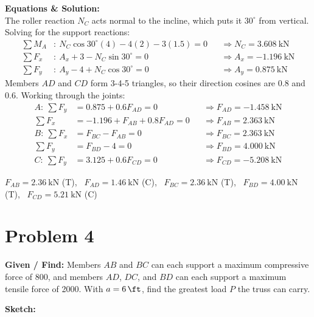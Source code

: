 \documentclass[11pt]{article}
\newcommand{\problemstart}[2]{%
    \clearpage
    \setlength{\parskip}{0.5\baselineskip}
    \setlength{\abovedisplayskip}{4pt}\setlength{\belowdisplayskip}{4pt}
    \section*{Problem #1}
    \textbf{Given / Find:} #2

    \textbf{Sketch:}
}
\begin{document}
\textbf{Equations \& Solution:}\\
The roller reaction $N_C$ acts normal to the incline, which puts it $30^\circ$ from vertical. Solving for the support reactions:
\begin{align*}
\textstyle\sum M_A&:\ N_C\cos30^\circ(4)-4(2)-3(1.5)=0 &&\Rightarrow N_C=\SI{3.608}{\kN}\\
\textstyle\sum F_x&:\ A_x+3-N_C\sin30^\circ=0 &&\Rightarrow A_x=\SI{-1.196}{\kN}\\
\textstyle\sum F_y&:\ A_y-4+N_C\cos30^\circ=0 &&\Rightarrow A_y=\SI{0.875}{\kN}
\end{align*}
Members $AD$ and $CD$ form 3-4-5 triangles, so their direction cosines are 0.8 and 0.6. Working through the joints:
\begin{align*}
A:\ \textstyle\sum F_y&=0.875+0.6F_{AD}=0 &&\Rightarrow F_{AD}=\SI{-1.458}{\kN}\\
\textstyle\sum F_x&=-1.196+F_{AB}+0.8F_{AD}=0 &&\Rightarrow F_{AB}=\SI{2.363}{\kN}\\
B:\ \textstyle\sum F_x&=F_{BC}-F_{AB}=0 &&\Rightarrow F_{BC}=\SI{2.363}{\kN}\\
\textstyle\sum F_y&=F_{BD}-4=0 &&\Rightarrow F_{BD}=\SI{4.000}{\kN}\\
C:\ \textstyle\sum F_y&=3.125+0.6F_{CD}=0 &&\Rightarrow F_{CD}=\SI{-5.208}{\kN}
\end{align*}

\begin{finalanswer}
$F_{AB}=\SI{2.36}{\kN}$ (T), \ $F_{AD}=\SI{1.46}{\kN}$ (C), \ $F_{BC}=\SI{2.36}{\kN}$ (T), \ $F_{BD}=\SI{4.00}{\kN}$ (T), \ $F_{CD}=\SI{5.21}{\kN}$ (C)
\end{finalanswer}

\problemstart{4}{Members $AB$ and $BC$ can each support a maximum compressive force of \SI{800}{\lb}, and members $AD$, $DC$, and $BD$ can each support a maximum tensile force of \SI{2000}{\lb}. With $a=\SI{6}{\ft}$, find the greatest load $P$ the truss can carry.}
\end{document}
